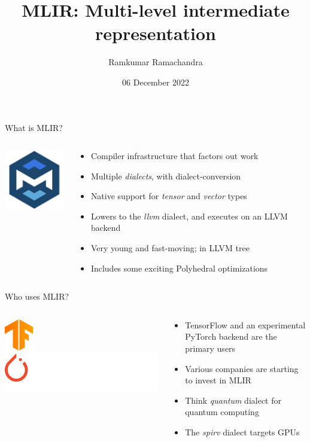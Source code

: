 \documentclass{beamer}
\title{MLIR: Multi-level intermediate representation}
\author{Ramkumar Ramachandra}
\institute{Raincode Labs}
\date{06 December 2022}
\begin{document}
\begin{frame}
  \titlepage
\end{frame}
\begin{frame}{What is MLIR?}
  \begin{columns}
    \begin{column}{3cm}
      \includegraphics[scale=0.6]{res/mlir-logo}
    \end{column}
    \begin{column}{7cm}
      \begin{itemize}
        \item Compiler infrastructure that factors out work
        \item Multiple \emph{dialects}, with dialect-conversion
        \item Native support for \emph{tensor} and \emph{vector} types
        \item Lowers to the \emph{llvm} dialect, and executes on an LLVM backend
        \item Very young and fast-moving; in LLVM tree
        \item Includes some exciting Polyhedral optimizations
      \end{itemize}
    \end{column}
  \end{columns}
\end{frame}
\begin{frame}{Who uses MLIR?}
  \begin{columns}
    \begin{column}{2cm}
      \includegraphics[scale=1.0]{res/tf-logo}
      \includegraphics[scale=0.7]{res/torch-logo}
    \end{column}
    \begin{column}{7cm}
      \begin{itemize}
        \item TensorFlow and an experimental PyTorch backend are the primary users
        \item Various companies are starting to invest in MLIR
        \item Think \emph{quantum} dialect for quantum computing
        \item The \emph{spirv} dialect targets GPUs
      \end{itemize}
    \end{column}
  \end{columns}
\end{frame}
\end{document}
